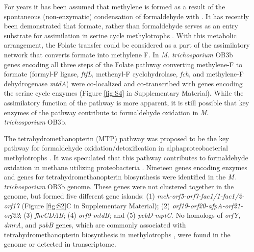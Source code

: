 For years it has been assumed that methylene  is formed as a result of the spontaneous (non-enzymatic) condensation of formaldehyde with  \cite{large1963}.
It has recently been demonstrated that formate, rather than formaldehyde serves as an entry substrate for assimilation in serine cycle methylotrophs \cite{crowther2008}.
With this metabolic arrangement, the Folate  transfer could be considered as a part of the assimilatory network that converts formate into methylene F.
In \textit{M. trichosporium} OB3b genes encoding all three steps of the Folate pathway converting methylene-F to formate (formyl-F ligase, \textit{ftfL}, methenyl-F cyclohydrolase, \textit{fch}, and methylene-F dehydrogenase \textit{mtdA}) were co-localized and co-transcribed with genes encoding the serine cycle enzymes (Figure \ref{fig:S4} in Supplementary Material).
While the assimilatory function of the pathway is more apparent, it is still possible that key enzymes of the pathway contribute to formaldehyde oxidation in \textit{M. trichosporium} OB3b.

The tetrahydromethanopterin (MTP) pathway was proposed to be the key pathway for formaldehyde oxidation/detoxification in alphaproteobacterial methylotrophs \cite{chistoserdova1998}.
It was speculated that this pathway contributes to formaldehyde oxidation in methane utilizing proteobacteria \cite{vorholt1999}.
Nineteen genes encoding enzymes and genes for tetrahydromethanopterin biosynthesis were identified in the \textit{M. trichosporium} OB3b genome.
These genes were not clustered together in the genome, but formed five different gene islands: (1) \textit{mch-orf5-orf7-fae1/1-fae1/2-orf17} (Figure \ref{fig:S2}C in Supplementary Material); (2) \textit{orf19-orf20-afpA-orf21-orf22}; (3) \textit{fhcCDAB}; (4) \textit{orf9-mtdB}; and (5) \textit{pcbD-mptG}.
No homologs of \textit{orfY}, \textit{dmrA}, and \textit{pabB} genes, which are commonly associated with tetrahydromethanopterin biosynthesis in methylotrophs \cite{caccamo2004, rasche2004, chistoserdova2005, kalyuzhnaya2005}, were found in the genome or detected in transcriptome.

